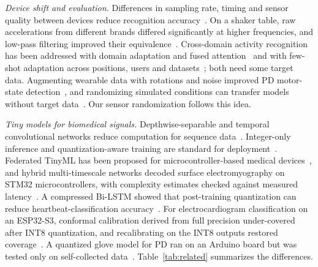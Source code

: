 \documentclass[preprint,12pt]{elsarticle}
\begin{document}
\emph{Device shift and evaluation.} Differences in sampling rate, timing and sensor quality between devices reduce recognition accuracy~\cite{Stisen2015}. On a shaker table, raw accelerations from different brands differed significantly at higher frequencies, and low-pass filtering improved their equivalence~\cite{CoyleAsbil2026}. Cross-domain activity recognition has been addressed with domain adaptation and fused attention~\cite{Zhu2025} and with few-shot adaptation across positions, users and datasets~\cite{Zheng2026}; both need some target data. Augmenting wearable data with rotations and noise improved PD motor-state detection~\cite{Um2017}, and randomizing simulated conditions can transfer models without target data~\cite{Tobin2017}. Our sensor randomization follows this idea.

\emph{Tiny models for biomedical signals.} Depthwise-separable and temporal convolutional networks reduce computation for sequence data~\cite{Howard2017,Bai2018}. Integer-only inference and quantization-aware training are standard for deployment~\cite{Jacob2018,Krishnamoorthi2018,Nagel2021}. Federated TinyML has been proposed for micro\-con\-trol\-ler-based medical devices~\cite{Ibrar2026}, and hybrid multi-timescale networks decoded surface electromyography on STM32 microcontrollers, with complexity estimates checked against measured latency~\cite{Ortone2026}. A compressed Bi-LSTM showed that post-training quantization can reduce heartbeat-classification accuracy~\cite{Nikandish2026}. For electrocardiogram classification on an ESP32-S3, conformal calibration derived from full precision under-covered after INT8 quantization, and recalibrating on the INT8 outputs restored coverage~\cite{ElAllam2026}. A quantized glove model for PD ran on an Arduino board but was tested only on self-collected data~\cite{Parikh2026}. Table~\ref{tab:related} summarizes the differences.
\end{document}
